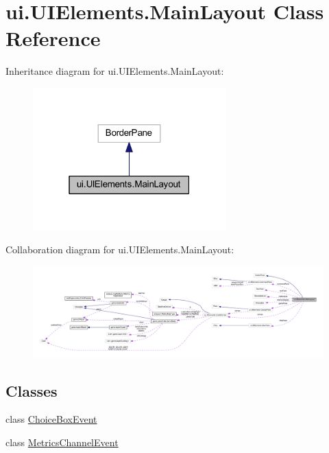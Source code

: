 \hypertarget{classui_1_1_u_i_elements_1_1_main_layout}{}\section{ui.\+U\+I\+Elements.\+Main\+Layout Class Reference}
\label{classui_1_1_u_i_elements_1_1_main_layout}


Inheritance diagram for ui.\+U\+I\+Elements.\+Main\+Layout\+:
\nopagebreak
\begin{figure}[H]
\begin{center}
\leavevmode
\includegraphics[width=211pt]{classui_1_1_u_i_elements_1_1_main_layout__inherit__graph}
\end{center}
\end{figure}


Collaboration diagram for ui.\+U\+I\+Elements.\+Main\+Layout\+:
\nopagebreak
\begin{figure}[H]
\begin{center}
\leavevmode
\includegraphics[width=350pt]{classui_1_1_u_i_elements_1_1_main_layout__coll__graph}
\end{center}
\end{figure}
\subsection*{Classes}
\begin{DoxyCompactItemize}
\item 
class \mbox{\hyperlink{classui_1_1_u_i_elements_1_1_main_layout_1_1_choice_box_event}{Choice\+Box\+Event}}
\item 
class \mbox{\hyperlink{classui_1_1_u_i_elements_1_1_main_layout_1_1_metrics_channel_event}{Metrics\+Channel\+Event}}
\end{DoxyCompactItemize}
